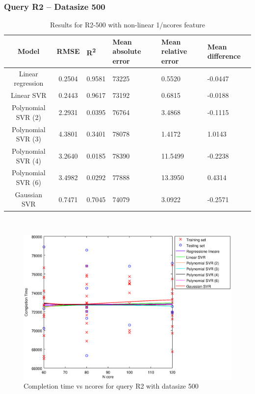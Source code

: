 \documentclass[a4paper,11pt]{article}
\begin{document}
\newpage
\subsubsection{Query R2 -- Datasize 500}
\begin{table}[H]
	\centering
	\begin{adjustbox}{center}
		\begin{tabular}{c | c M{1.2cm} M{2.5cm} M{2.5cm} M{1.8cm}}
			Model & RMSE & R\textsuperscript{2} & Mean absolute error & Mean relative error & Mean difference \tabularnewline
			\hline
			Linear regression & 0.2504 & 0.9581 &  73225 & 0.5520 & -0.0447 \\
			Linear SVR & 0.2443 & 0.9617 &  73192 & 0.6815 & -0.0188 \\
			Polynomial SVR (2) & 2.2931 & 0.0395 &  76764 & 3.4868 & -0.1115 \\
			Polynomial SVR (3) & 4.3801 & 0.3401 &  78078 & 1.4172 & 1.0143 \\
			Polynomial SVR (4) & 3.2640 & 0.0185 &  78390 & 11.5499 & -0.2238 \\
			Polynomial SVR (6) & 3.4982 & 0.0292 &  77888 & 13.3950 & 0.4314 \\
			Gaussian SVR & 0.7471 & 0.7045 &  74079 & 3.0922 & -0.2571 \\
		\end{tabular}
	\end{adjustbox}
	\\
	\caption{Results for R2-500 with non-linear 1/ncores feature}
	\label{table_R2_prediction_all}
\end{table}

\begin {figure}[hbtp]
\centering
\includegraphics[width=\textwidth]{output/R2_500_1_OVER_NCORES/plot_R2_500.eps}
\caption {Completion time vs ncores for query R2 with datasize 500}
\end {figure}
\end{document}
